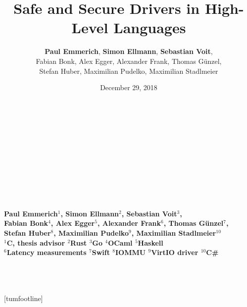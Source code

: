 \documentclass[NET,english,aspectratio=169,notitleframe,draft]{tumbeamer}
\author[Paul Emmerich, Simon Ellmann, Sebastian Voit]{\textbf{Paul Emmerich}, \textbf{Simon Ellmann}, \textbf{Sebastian Voit},\\ Fabian Bonk, Alex Egger, Alexander Frank, Thomas Günzel,\\ Stefan Huber,  Maximilian Pudelko, Maximilian Stadlmeier}
\title{Safe and Secure Drivers in High-Level Languages}
\date{December 29, 2018}
\begin{document}
  \begin{frame}[c,noframenumbering]
  \centering%
  \Large%
  \strut\textcolor{TUMBlue}{\inserttitle}%
  \\[4ex]%
  \normalsize%
  \strut\insertauthor%
  \\[2ex]%
  \footnotesize%
  \insertdate%
  \\[4ex]%
  \ifdefined\departmentname%
    \ifdefined\chairname%
      \chairname\\%
    \fi%
    \departmentname\\%
  \fi%
  \TUMname\\%
\end{frame}

  \begin{frame}[c,noframenumbering]
  \centering%
  \Large%
  \strut\textcolor{TUMBlue}{\inserttitle}%
  \\[4ex]%
  \normalsize%
  \strut{}\bfseries Paul Emmerich$^1$, Simon Ellmann$^2$, Sebastian Voit$^3$,\\ Fabian Bonk$^4$, Alex Egger$^5$, Alexander Frank$^6$, Thomas Günzel$^7$,\\ Stefan Huber$^8$, Maximilian Pudelko$^9$, Maximilian Stadlmeier$^{10}$ \normalfont %
  \\[2ex]%
  \footnotesize%
  $^1$C, thesis advisor\hspace{1em}
  $^2$Rust\hspace{1em}
  $^3$Go\hspace{1em}
  $^4$OCaml\hspace{1em}
  $^5$Haskell\hspace{1em}\\
  $^6$Latency measurements\hspace{1em}
  $^7$Swift\hspace{1em}
  $^8$IOMMU\hspace{1em}
  $^9$VirtIO driver\hspace{1em}
  $^{10}$C\#\hspace{1em}
  \\[4ex]%
    \ifdefined\departmentname%
    \ifdefined\chairname%
      \chairname\\%
    \fi%
    \departmentname\\%
  \fi%
  \TUMname\\%
\end{frame}
[tumfootline]
\end{document}
